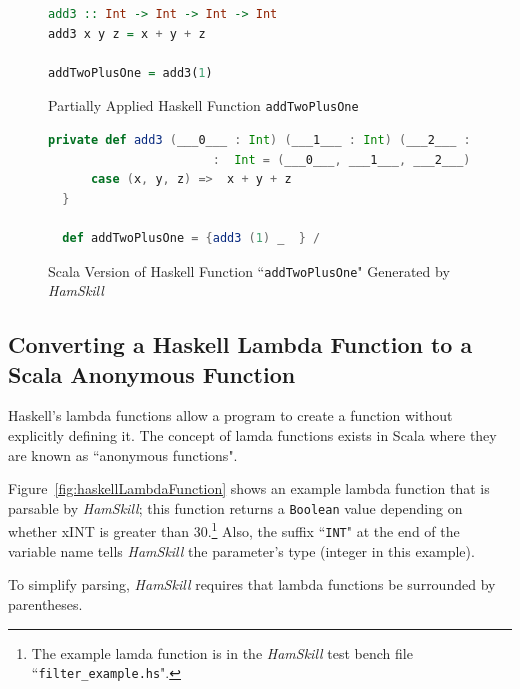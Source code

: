 \documentclass{report}
\begin{document}
\begin{figure}[H]
\begin{mdframed}
\begin{lstlisting}[language=Haskell]
add3 :: Int -> Int -> Int -> Int
add3 x y z = x + y + z

addTwoPlusOne = add3(1)
\end{lstlisting}
\end{mdframed}
\caption{Partially Applied Haskell Function \texttt{addTwoPlusOne}}\label{fig:haskellFunctionAddTwoPlusOne}
\end{figure}

\begin{figure}[H]
\begin{mdframed}
\begin{lstlisting}[language=Scala, basicstyle=\scriptsize]
  private def add3 (___0___ : Int) (___1___ : Int) (___2___ : Int) 
                       :  Int = (___0___, ___1___, ___2___) match {
      case (x, y, z) =>  x + y + z
  } 

  def addTwoPlusOne = {add3 (1) _  } /
\end{lstlisting}
\end{mdframed}
\caption{Scala Version of Haskell Function ``\texttt{addTwoPlusOne}" Generated by \textit{HamSkill}}\label{fig:scalaFunctionAddTwoPlusOne}
\end{figure}


\subsection{Converting a Haskell Lambda Function to a Scala Anonymous Function}\label{sec:lambdaAnonymousFunctions}

Haskell's lambda functions allow a program to create a function without explicitly defining it.  The concept of lamda functions exists in Scala where they are known as ``anonymous functions".

Figure~\ref{fig:haskellLambdaFunction} shows an example lambda function that is parsable by \textit{HamSkill}; this function returns a \texttt{Boolean} value depending on whether xINT is greater than 30.\footnote{The example lamda function is in the \textit{HamSkill} test bench file ``\texttt{filter\_example.hs}".}  Also, the suffix ``\texttt{INT}" at the end of the variable name tells \textit{HamSkill} the parameter's type (integer in this example).

To simplify parsing, \textit{HamSkill} requires that lambda functions be surrounded by parentheses.
\end{document}

